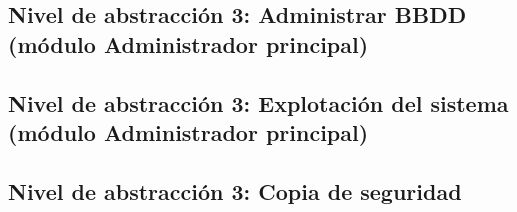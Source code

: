 \subsection{Nivel de abstracción 3: Administrar BBDD (módulo Administrador principal)}



\subsection{Nivel de abstracción 3: Explotación del sistema (módulo Administrador principal)}



\subsection{Nivel de abstracción 3: Copia de seguridad}

